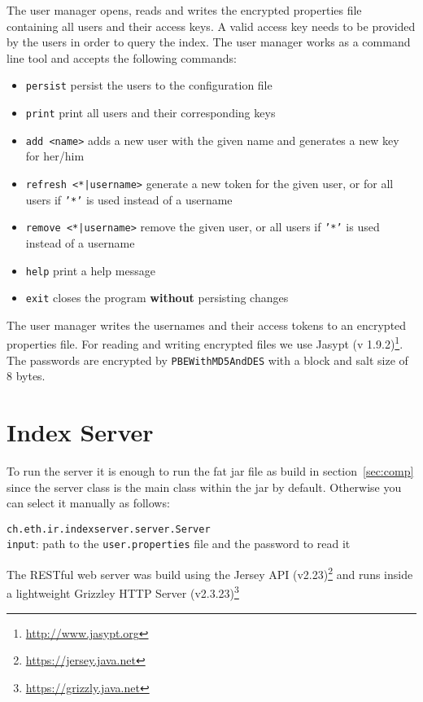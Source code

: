 \documentclass[a4paper,11pt]{article}
\begin{document}
The user manager opens, reads and writes the encrypted properties file containing all users and their access keys. A valid access key needs to be provided by the users in order to query the index. The user manager works as a command line tool and accepts the following commands: 
\begin{itemize}
\item \texttt{persist} persist the users to the configuration file
\item \texttt{print} print all users and their corresponding keys 
\item \texttt{add <name>} adds a new user with the given name and generates a new key for her/him
\item \texttt{refresh <*|username>} generate a new token for the given user, or for all users if \texttt{'*'} is used instead of a username 
\item \texttt{remove <*|username>} remove the given user, or all users if \texttt{'*'} is used instead of a username
\item \texttt{help} print a help message 
\item \texttt{exit} closes the program \textbf{without} persisting changes
\end{itemize}

The user manager writes the usernames and their access tokens to an encrypted properties file. For reading and writing encrypted files we use Jasypt (v 1.9.2)\footnote{\url{http://www.jasypt.org}}. The passwords are encrypted by \texttt{PBEWithMD5AndDES} with a block and salt size of 8 bytes.

\section{Index Server}
To run the server it is enough to run the fat jar file as build in section~\ref{sec:comp} since the server class is the main class within the jar by default. Otherwise you can select it manually as follows:
\begin{leftbar}
\texttt{ch.eth.ir.indexserver.server.Server}\\
\texttt{input}: path to the \texttt{user.properties} file and the password to read it
\end{leftbar}

The RESTful web server was build using the Jersey API (v2.23)\footnote{\url{https://jersey.java.net}} and runs inside a lightweight Grizzley HTTP Server (v2.3.23)\footnote{\url{https://grizzly.java.net}}
\end{document}
